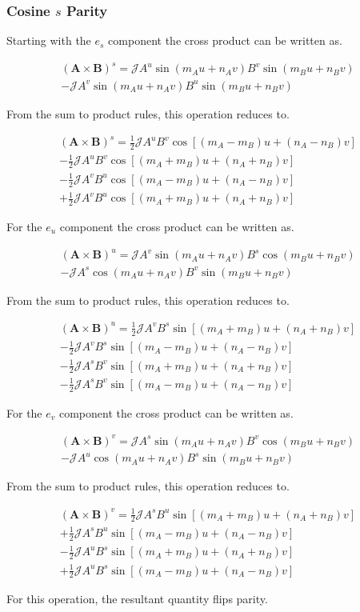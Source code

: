 \documentclass[11pt]{article}
\newcommand{\brackets}[1]{\left(#1\right)}
\newcommand{\sqbrackets}[1]{\left[#1\right]}
\renewcommand{\vec}[1]{\boldsymbol#1}
\newcommand{\equ}[2]{
	\begin{equation}
    \begin{split}
	#1
	\label{#2}
	\end{split}
	\end{equation}
}
\newcommand{\crossp}[2]{#1\times#2}
\begin{document}
\subsubsection{Cosine $s$ Parity}
Starting with the $e_{s}$ component the cross product can be written as.
\equ{
\brackets{\crossp{\vec{A}}{\vec{B}}}^{s}=
\mathcal{J}A^{u}\sin\brackets{m_{A}u+n_{A}v}B^{v}\sin\brackets{m_{B}u+n_{B}v}\\
-\mathcal{J}A^{v}\sin\brackets{m_{A}u+n_{A}v}B^{u}\sin\brackets{m_{B}u+n_{B}v}
}{equ:cross_esubs_cosine}
From the sum to product rules, this operation reduces to.
\equ{
\brackets{\crossp{\vec{A}}{\vec{B}}}^{s}=
\frac{1}{2}\mathcal{J}A^{u}B^{v}\cos\sqbrackets{\brackets{m_{A}-m_{B}}u+\brackets{n_{A}-n_{B}}v}\\
-\frac{1}{2}\mathcal{J}A^{u}B^{v}\cos\sqbrackets{\brackets{m_{A}+m_{B}}u+\brackets{n_{A}+n_{B}}v}\\
-\frac{1}{2}\mathcal{J}A^{v}B^{u}\cos\sqbrackets{\brackets{m_{A}-m_{B}}u+\brackets{n_{A}-n_{B}}v}\\
+\frac{1}{2}\mathcal{J}A^{v}B^{u}\cos\sqbrackets{\brackets{m_{A}+m_{B}}u+\brackets{n_{A}+n_{B}}v}
}{equ:cross_esubs2_cosine}

For the $e_{u}$ component the cross product can be written as.
\equ{
\brackets{\crossp{\vec{A}}{\vec{B}}}^{u}=
\mathcal{J}A^{v}\sin\brackets{m_{A}u+n_{A}v}B^{s}\cos\brackets{m_{B}u+n_{B}v}\\
-\mathcal{J}A^{s}\cos\brackets{m_{A}u+n_{A}v}B^{v}\sin\brackets{m_{B}u+n_{B}v}
}{equ:cross_esubu_cosine}
From the sum to product rules, this operation reduces to.
\equ{
\brackets{\crossp{\vec{A}}{\vec{B}}}^{u}=
\frac{1}{2}\mathcal{J}A^{v}B^{s}\sin\sqbrackets{\brackets{m_{A}+m_{B}}u+\brackets{n_{A}+n_{B}}v}\\
-\frac{1}{2}\mathcal{J}A^{v}B^{s}\sin\sqbrackets{\brackets{m_{A}-m_{B}}u+\brackets{n_{A}-n_{B}}v}\\
-\frac{1}{2}\mathcal{J}A^{s}B^{v}\sin\sqbrackets{\brackets{m_{A}+m_{B}}u+\brackets{n_{A}+n_{B}}v}\\
-\frac{1}{2}\mathcal{J}A^{s}B^{v}\sin\sqbrackets{\brackets{m_{A}-m_{B}}u+\brackets{n_{A}-n_{B}}v}
}{equ:cross_esubu2_cosine}

For the $e_{v}$ component the cross product can be written as.
\equ{
\brackets{\crossp{\vec{A}}{\vec{B}}}^{v}=\mathcal{J}A^{s}\sin\brackets{m_{A}u+n_{A}v}B^{v}\cos\brackets{m_{B}u+n_{B}v}\\
-\mathcal{J}A^{u}\cos\brackets{m_{A}u+n_{A}v}B^{s}\sin\brackets{m_{B}u+n_{B}v}
}{equ:cross_esubv_cosine}
From the sum to product rules, this operation reduces to.
\equ{
\brackets{\crossp{\vec{A}}{\vec{B}}}^{v}=
\frac{1}{2}\mathcal{J}A^{s}B^{u}\sin\sqbrackets{\brackets{m_{A}+m_{B}}u+\brackets{n_{A}+n_{B}}v}\\
+\frac{1}{2}\mathcal{J}A^{s}B^{u}\sin\sqbrackets{\brackets{m_{A}-m_{B}}u+\brackets{n_{A}-n_{B}}v}\\
-\frac{1}{2}\mathcal{J}A^{u}B^{s}\sin\sqbrackets{\brackets{m_{A}+m_{B}}u+\brackets{n_{A}+n_{B}}v}\\
+\frac{1}{2}\mathcal{J}A^{u}B^{s}\sin\sqbrackets{\brackets{m_{A}-m_{B}}u+\brackets{n_{A}-n_{B}}v}
}{equ:cross_esubv2_cosine}
For this operation, the resultant quantity flips parity.
\end{document}
